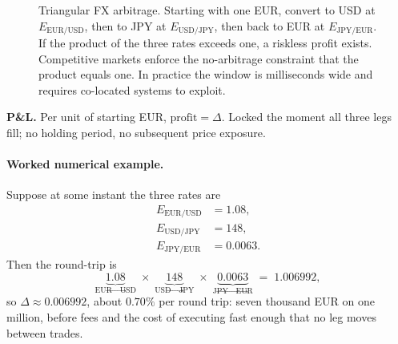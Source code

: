 \begin{figure}[ht]
\centering
{}
\caption{Triangular FX arbitrage. Starting with one EUR, convert to USD at
$E_{\mathrm{EUR/USD}}$, then to JPY at $E_{\mathrm{USD/JPY}}$, then back to
EUR at $E_{\mathrm{JPY/EUR}}$. If the product of the three rates exceeds one,
a riskless profit exists. Competitive markets enforce the no-arbitrage
constraint that the product equals one. In practice the window is
milliseconds wide and requires co-located systems to exploit.}
\label{fig:triangular_arb}
\end{figure}

\textbf{P\&L.} Per unit of starting EUR, $\text{profit} =
\Delta$. Locked the moment all three legs fill; no holding
period, no subsequent price exposure.

\paragraph{Worked numerical example.} Suppose at some instant
the three rates are
\begin{align*}
  E_{\text{EUR}/\text{USD}} &= 1.08, \\
  E_{\text{USD}/\text{JPY}} &= 148, \\
  E_{\text{JPY}/\text{EUR}} &= 0.0063.
\end{align*}
Then the round-trip is
\begin{equation*}
  \underbrace{1.08}_{\text{EUR}\to\text{USD}}
  \;\times\;
  \underbrace{148}_{\text{USD}\to\text{JPY}}
  \;\times\;
  \underbrace{0.0063}_{\text{JPY}\to\text{EUR}}
  \;=\; 1.006992,
\end{equation*}
so $\Delta \approx 0.006992$, about $0.70\%$ per round trip:
seven thousand EUR on one million, before fees and the cost of
executing fast enough that no leg moves between trades.

